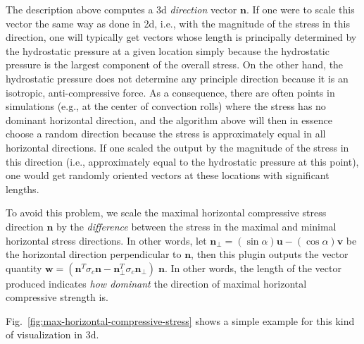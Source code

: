 \begin{itemize}
The description above computes a 3d \textit{direction} vector $\mathbf n$. If one were to scale this vector the same way as done in 2d, i.e., with the magnitude of the stress in this direction, one will typically get vectors whose length is principally determined by the hydrostatic pressure at a given location simply because the hydrostatic pressure is the largest component of the overall stress. On the other hand, the hydrostatic pressure does not determine any principle direction because it is an isotropic, anti-compressive force. As a consequence, there are often points in simulations (e.g., at the center of convection rolls) where the stress has no dominant horizontal direction, and the algorithm above will then in essence choose a random direction because the stress is approximately equal in all horizontal directions. If one scaled the output by the magnitude of the stress in this direction (i.e., approximately equal to the hydrostatic pressure at this point), one would get randomly oriented vectors at these locations with significant lengths.

To avoid this problem, we scale the maximal horizontal compressive stress direction $\mathbf n$ by the \textit{difference} between the stress in the maximal and minimal horizontal stress directions. In other words, let $\mathbf n_\perp=(\sin \alpha)\mathbf u - (\cos\alpha)\mathbf v$ be the horizontal direction perpendicular to $\mathbf n$, then this plugin outputs the vector quantity $\mathbf w = (\mathbf n^T \sigma_c \mathbf n                -\mathbf n^T_\perp \sigma_c \mathbf n_\perp)               \; \mathbf n$. In other words, the length of the vector produced indicates \textit{how dominant} the direction of maximal horizontal compressive strength is.

Fig.~\ref{fig:max-horizontal-compressive-stress} shows a simple example for this kind of visualization in 3d.


\end{itemize}
